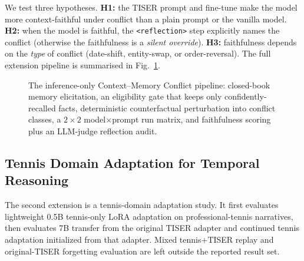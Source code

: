 \documentclass[conference]{IEEEtran}
\begin{document}
We test three hypotheses. \textbf{H1:} the TISER prompt and fine-tune make the model more context-faithful under conflict than a plain prompt or the vanilla model. \textbf{H2:} when the model is faithful, the \texttt{<reflection>} step explicitly names the conflict (otherwise the faithfulness is a \emph{silent override}). \textbf{H3:} faithfulness depends on the \emph{type} of conflict (date-shift, entity-swap, or order-reversal). The full extension pipeline is summarised in Fig.~\ref{fig:pipeline}.

\begin{figure}[t]
\centering
{}
\caption{The inference-only Context--Memory Conflict pipeline: closed-book memory elicitation, an eligibility gate that keeps only confidently-recalled facts, deterministic counterfactual perturbation into conflict classes, a $2{\times}2$ model$\times$prompt run matrix, and faithfulness scoring plus an LLM-judge reflection audit.}
\label{fig:pipeline}
\end{figure}

\subsection{Tennis Domain Adaptation for Temporal Reasoning}

The second extension is a tennis-domain adaptation study. It first evaluates lightweight 0.5B tennis-only LoRA adaptation on professional-tennis narratives, then evaluates 7B transfer from the original TISER adapter and continued tennis adaptation initialized from that adapter. Mixed tennis+TISER replay and original-TISER forgetting evaluation are left outside the reported result set.
\end{document}
